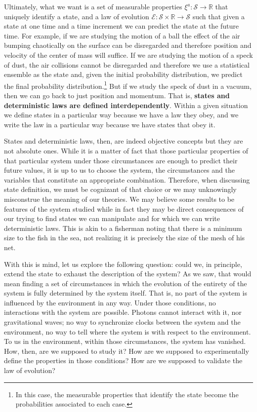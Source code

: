 \documentclass[applsci,article,submit,moreauthors,pdftex]{Definitions/mdpi}
\begin{document}
Ultimately, what we want is a set of measurable properties $\xi^a : \mathcal{S} \to \mathbb{R}$ that uniquely identify a state, and a law of evolution $\mathcal{E} : \mathcal{S} \times \mathbb{R} \to \mathcal{S}$ such that given a state at one time and a time increment we can predict the state at the future time. For example, if we are studying the motion of a ball the effect of the air bumping chaotically on the surface can be disregarded and therefore position and velocity of the center of mass will suffice. If we are studying the motion of a speck of dust, the air collisions cannot be disregarded and therefore we use a statistical ensemble as the state and, given the initial probability distribution, we predict the final probability distribution.\footnote{In this case, the measurable properties that identify the state become the probabilities associated to each case.} But if we study the speck of dust in a vacuum, then we can go back to just position and momentum. That is, \textbf{states and deterministic laws are defined interdependently}. Within a given situation we define states in a particular way because we have a law they obey, and we write the law in a particular way because we have states that obey it.

States and deterministic laws, then, are indeed objective concepts but they are not absolute ones. While it is a matter of fact that those particular properties of that particular system under those circumstances are enough to predict their future values, it is up to us to choose the system, the circumstances and the variables that constitute an appropriate combination. Therefore, when discussing state definition, we must be cognizant of that choice or we may unknowingly misconstrue the meaning of our theories. We may believe some results to be features of the system studied while in fact they may be direct consequences of our trying to find states we can manipulate and for which we can write deterministic laws. This is akin to a fisherman noting that there is a minimum size to the fish in the sea, not realizing it is precisely the size of the mesh of his net.

With this is mind, let us explore the following question: could we, in principle, extend the state to exhaust the description of the system? As we saw, that would mean finding a set of circumstances in which the evolution of the entirety of the system is fully determined by the system itself. That is, no part of the system is influenced by the environment in any way. Under those conditions, no interactions with the system are possible. Photons cannot interact with it, nor gravitational waves; no way to synchronize clocks between the system and the environment, no way to tell where the system is with respect to the environment. To us in the environment, within those circumstances, the system has vanished. How, then, are we supposed to study it? How are we supposed to experimentally define the properties in those conditions? How are we supposed to validate the law of evolution?
\end{document}
